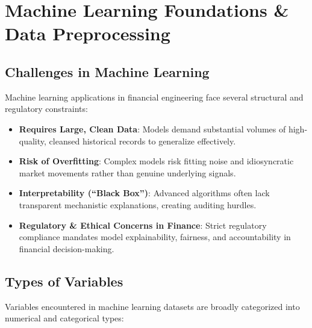 \chapter{Machine Learning Foundations \& Data Preprocessing}

\section{Challenges in Machine Learning}

Machine learning applications in financial engineering face several structural and regulatory constraints:

\begin{itemize}[leftmargin=1.5em]
    \item \textbf{Requires Large, Clean Data}: Models demand substantial volumes of high-quality, cleansed historical records to generalize effectively.
    \item \textbf{Risk of Overfitting}: Complex models risk fitting noise and idiosyncratic market movements rather than genuine underlying signals.
    \item \textbf{Interpretability (\textquotedblleft Black Box\textquotedblright)}: Advanced algorithms often lack transparent mechanistic explanations, creating auditing hurdles.
    \item \textbf{Regulatory \& Ethical Concerns in Finance}: Strict regulatory compliance mandates model explainability, fairness, and accountability in financial decision-making.
\end{itemize}

\section{Types of Variables}

Variables encountered in machine learning datasets are broadly categorized into numerical and categorical types:

\begin{center}
\end{center}

